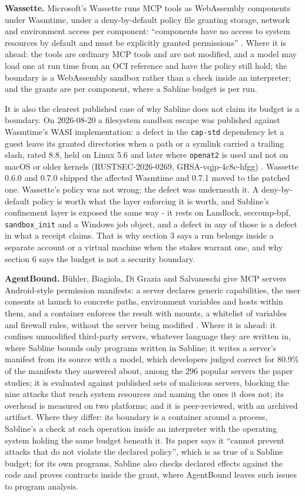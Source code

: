 \documentclass[
]{article}
\begin{document}
\textbf{Wassette.} Microsoft's Wassette runs MCP tools as WebAssembly
components under Wasmtime, under a deny-by-default policy file granting
storage, network and environment access per component: ``components have
no access to system resources by default and must be explicitly granted
permissions'' \citep{wassette}. Where it is ahead: the tools are
ordinary MCP tools and are not modified, and a model may load one at run
time from an OCI reference and have the policy still hold; the boundary
is a WebAssembly sandbox rather than a check inside an interpreter; and
the grants are per component, where a Sabline budget is per run.

It is also the clearest published case of why Sabline does not claim its
budget is a boundary. On 2026-08-20 a filesystem sandbox escape was
published against Wasmtime's WASI implementation: a defect in the
\texttt{cap-std} dependency let a guest leave its granted directories
when a path or a symlink carried a trailing slash, rated 8.8, held on
Linux 5.6 and later where \texttt{openat2} is used and not on macOS or
older kernels (RUSTSEC-2026-0269, GHSA-vqjp-4c8c-hfgg)
\citep{rustsec2026trailing}. Wassette 0.6.0 and 0.7.0 shipped the
affected Wasmtime and 0.7.1 moved to the patched one. Wassette's policy
was not wrong; the defect was underneath it. A deny-by-default policy is
worth what the layer enforcing it is worth, and Sabline's confinement
layer is exposed the same way - it rests on Landlock, seccomp-bpf,
\texttt{sandbox\_init} and a Windows job object, and a defect in any of
those is a defect in what a receipt claims. That is why section 3 says a
run belongs inside a separate account or a virtual machine when the
stakes warrant one, and why section 6 says the budget is not a security
boundary.

\textbf{AgentBound.} B\"{u}hler, Biagiola, Di Grazia and Salvaneschi
give MCP servers Android-style permission manifests: a server declares
generic capabilities, the user consents at launch to concrete paths,
environment variables and hosts within them, and a container enforces
the result with mounts, a whitelist of variables and firewall rules,
without the server being modified \citep{buhler2026agentbound}. Where it
is ahead: it confines unmodified third-party servers, whatever language
they are written in, where Sabline bounds only programs written in
Sabline; it writes a server's manifest from its source with a model,
which developers judged correct for 80.9\% of the manifests they
answered about, among the 296 popular servers the paper studies; it is
evaluated against published sets of malicious servers, blocking the nine
attacks that reach system resources and naming the ones it does not; its
overhead is measured on two platforms; and it is peer-reviewed, with an
archived artifact. Where they differ: its boundary is a container around
a process, Sabline's a check at each operation inside an interpreter
with the operating system holding the same budget beneath it. Its paper
says it ``cannot prevent attacks that do not violate the declared
policy'', which is as true of a Sabline budget; for its own programs,
Sabline also checks declared effects against the code and proves
contracts inside the grant, where AgentBound leaves such issues to
program analysis.
\end{document}
